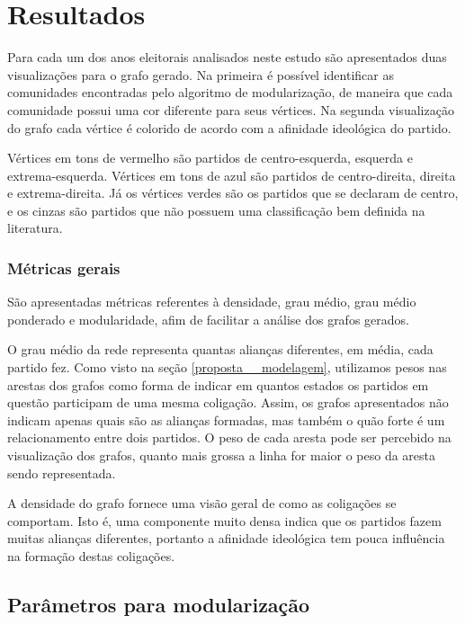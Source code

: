 \chapter{Resultados}
\label{resultados}

Para cada um dos anos eleitorais analisados neste estudo são apresentados duas visualizações para o grafo gerado. Na primeira é possível identificar as comunidades encontradas pelo algoritmo de modularização, de maneira que cada comunidade possui uma cor diferente para seus vértices. Na segunda visualização do grafo cada vértice é colorido de acordo com a afinidade ideológica do partido.

Vértices em tons de vermelho são partidos de centro-esquerda, esquerda e extrema-esquerda. Vértices em tons de azul são partidos de centro-direita, direita e extrema-direita. Já os vértices verdes são os partidos que se declaram de centro, e os cinzas são partidos que não possuem uma classificação bem definida na literatura.

\subsection{Métricas gerais}
\label{proposta__objetivos-especificos--dados-gerais}

São apresentadas métricas referentes à densidade, grau médio, grau médio ponderado e modularidade, afim de facilitar a análise dos grafos gerados.


O grau médio da rede representa quantas alianças diferentes, em média, cada partido fez. Como visto na seção \ref{proposta__modelagem}, utilizamos pesos nas arestas dos grafos como forma de indicar em quantos estados os partidos em questão participam de uma mesma coligação. Assim, os grafos apresentados não indicam apenas quais são as alianças formadas, mas também o quão forte é um relacionamento entre dois partidos. O peso de cada aresta pode ser percebido na visualização dos grafos, quanto mais grossa a linha for maior o peso da aresta sendo representada.

A densidade do grafo fornece uma visão geral de como as coligações se comportam. Isto é, uma componente muito densa indica que os partidos fazem muitas alianças diferentes, portanto a afinidade ideológica tem pouca influência na formação destas coligações.

\section{Parâmetros para modularização}
\label{resultados__parametros-modularizacao}

